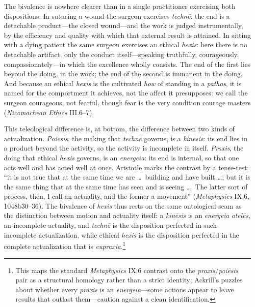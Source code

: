 The bivalence is nowhere clearer than in a single practitioner exercising both dispositions. In suturing a wound the surgeon exercises \textit{technē}: the end is a detachable product---the closed wound---and the work is judged instrumentally, by the efficiency and quality with which that external result is attained. In sitting with a dying patient the same surgeon exercises an ethical \textit{hexis}: here there is no detachable artifact, only the conduct itself---speaking truthfully, courageously, compassionately---in which the excellence wholly consists. The end of the first lies beyond the doing, in the work; the end of the second is immanent in the doing. And because an ethical \textit{hexis} is the cultivated \textit{how} of standing in a \textit{pathos}, it is named for the comportment it achieves, not the affect it presupposes: we call the surgeon courageous, not fearful, though fear is the very condition courage masters (\textit{Nicomachean Ethics} III.6--7).

This teleological difference is, at bottom, the difference between two kinds of actualization. \textit{Poiēsis}, the making that \textit{technē} governs, is a \textit{kinēsis}: its end lies in a product beyond the activity, so the activity is incomplete in itself. \textit{Praxis}, the doing that ethical \textit{hexis} governs, is an \textit{energeia}: its end is internal, so that one acts well and has acted well at once. Aristotle marks the contrast by a tense-test: ``it is not true that at the same time we are \ldots\ building and have built \ldots; but it is the same thing that at the same time has seen and is seeing \ldots. The latter sort of process, then, I call an actuality, and the former a movement'' (\textit{Metaphysics} IX.6, 1048b30--36). The bivalence of \textit{hexis} thus rests on the same ontological seam as the distinction between motion and actuality itself: a \textit{kinēsis} is an \textit{energeia atelēs}, an incomplete actuality, and \textit{technē} is the disposition perfected in such incomplete actualization, while ethical \textit{hexis} is the disposition perfected in the complete actualization that is \textit{eupraxia}.\footnote{This maps the standard \textit{Metaphysics} IX.6 contrast onto the \textit{praxis}/\textit{poiēsis} pair as a structural homology rather than a strict identity; Ackrill's puzzles about whether every \textit{praxis} is an \textit{energeia}---some actions appear to leave results that outlast them---caution against a clean identification.}

